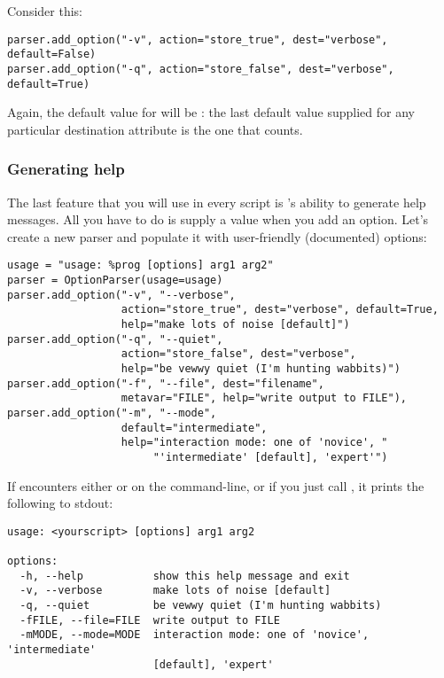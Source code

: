 Consider this:

\begin{verbatim}
parser.add_option("-v", action="store_true", dest="verbose", default=False)
parser.add_option("-q", action="store_false", dest="verbose", default=True)
\end{verbatim}

Again, the default value for  will be : the last
default value supplied for any particular destination attribute is the
one that counts.

\subsubsection{Generating help\label{optparse-generating-help}}

The last feature that you will use in every script is
's ability to generate help messages.  All you have
to do is supply a  value when you add an option.  Let's
create a new parser and populate it with user-friendly (documented)
options:

\begin{verbatim}
usage = "usage: %prog [options] arg1 arg2"
parser = OptionParser(usage=usage)
parser.add_option("-v", "--verbose",
                  action="store_true", dest="verbose", default=True,
                  help="make lots of noise [default]")
parser.add_option("-q", "--quiet",
                  action="store_false", dest="verbose", 
                  help="be vewwy quiet (I'm hunting wabbits)")
parser.add_option("-f", "--file", dest="filename",
                  metavar="FILE", help="write output to FILE"),
parser.add_option("-m", "--mode",
                  default="intermediate",
                  help="interaction mode: one of 'novice', "
                       "'intermediate' [default], 'expert'")
\end{verbatim}

If  encounters either  or
 on the command-line, or if you just call
, it prints the following to stdout:

\begin{verbatim}
usage: <yourscript> [options] arg1 arg2

options:
  -h, --help           show this help message and exit
  -v, --verbose        make lots of noise [default]
  -q, --quiet          be vewwy quiet (I'm hunting wabbits)
  -fFILE, --file=FILE  write output to FILE
  -mMODE, --mode=MODE  interaction mode: one of 'novice', 'intermediate'
                       [default], 'expert'
\end{verbatim}

